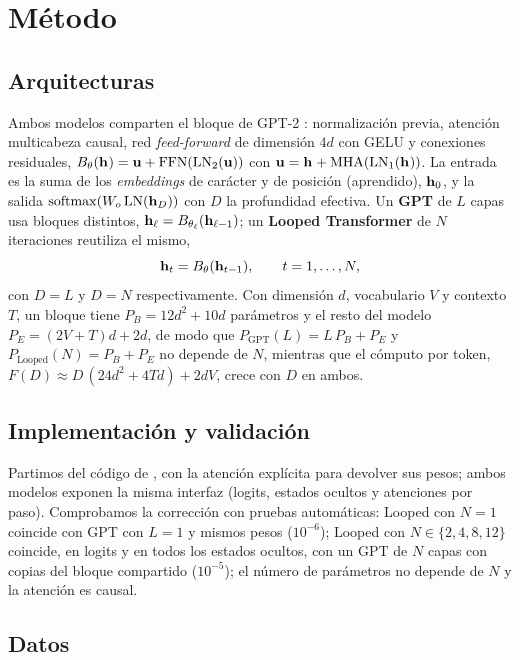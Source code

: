 \section{Método}

\subsection{Arquitecturas}
\label{sec:arquitecturas}

Ambos modelos comparten el bloque de GPT-2 \citep{radford2019language}:
normalización previa, atención multicabeza causal, red \emph{feed-forward} de
dimensión $4d$ con GELU y conexiones residuales,
$B_\theta(\mathbf{h}_{}) = \mathbf{u} + \mathrm{FFN}(\mathrm{LN}_2(\mathbf{u}))$ con
$\mathbf{u} = \mathbf{h}_{} + \mathrm{MHA}(\mathrm{LN}_1(\mathbf{h}_{}))$. La entrada es la suma de los
\emph{embeddings} de carácter y de posición (aprendido), $\mathbf{h}_{0}$, y la salida
$\mathrm{softmax}(W_o\,\mathrm{LN}(\mathbf{h}_{D}))$ con $D$ la profundidad efectiva. Un
\textbf{GPT} de $L$ capas usa bloques distintos, $\mathbf{h}_{\ell}=B_{\theta_\ell}(\mathbf{h}_{\ell-1})$;
un \textbf{Looped Transformer} de $N$ iteraciones reutiliza el mismo,
\begin{equation}
\mathbf{h}_{t} = B_\theta(\mathbf{h}_{t-1}),\qquad t = 1,\dots,N,
\end{equation}
con $D=L$ y $D=N$ respectivamente. Con dimensión $d$, vocabulario $V$ y contexto
$T$, un bloque tiene $P_B = 12d^2 + 10d$ parámetros y el resto del modelo
$P_E = (2V+T)d + 2d$, de modo que $P_\text{GPT}(L) = L\,P_B + P_E$ y
$P_\text{Looped}(N) = P_B + P_E$ no depende de $N$, mientras que el cómputo por
token, $F(D) \approx D\,(24d^2 + 4Td) + 2dV$, crece con $D$ en ambos.

\subsection{Implementación y validación}
\label{sec:validacion}

Partimos del código de \citet{raschka2024build}, con la atención explícita para
devolver sus pesos; ambos modelos exponen la misma interfaz (logits, estados
ocultos y atenciones por paso). Comprobamos la corrección con pruebas
automáticas: Looped con $N{=}1$ coincide con GPT con $L{=}1$ y mismos
pesos ($10^{-6}$); Looped con $N\in\{2,4,8,12\}$ coincide, en logits y en todos
los estados ocultos, con un GPT de $N$ capas con copias del bloque compartido
($10^{-5}$); el número de parámetros no depende de $N$ y la atención es causal.

\subsection{Datos}
\label{sec:datos}


